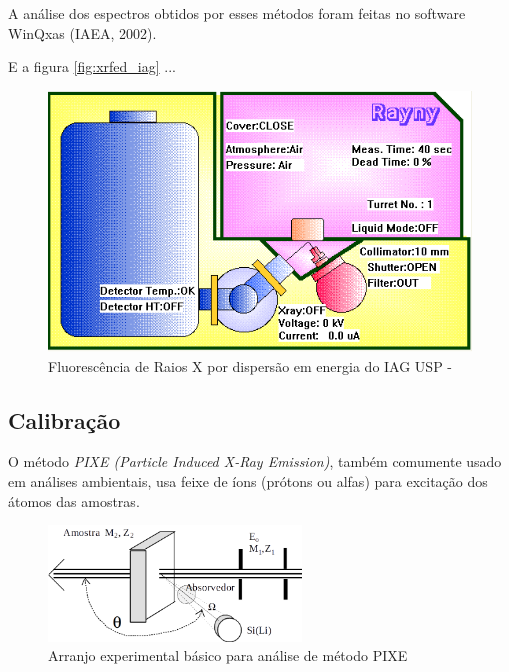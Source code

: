 
A análise dos espectros obtidos por esses métodos foram feitas no software WinQxas (IAEA, 2002).





E a figura \ref{fig:xrfed_iag} ...

\begin{figure}[H]
\begin{center}
  \includegraphics[scale=0.4]{../inputs/images/edx_iag_monitor.png}
  \caption{Fluorescência de Raios X por dispersão em energia do IAG USP - \label{fig:xrfed_software}}
\end{center}
\end{figure}

\subsection{Calibração}

O método \textit{PIXE (Particle Induced X-Ray Emission)}, 
também comumente usado em análises ambientais, usa feixe de íons 
(prótons ou alfas) para excitação dos átomos das amostras.

\begin{figure}[H]
\begin{center} 
  \includegraphics[width=0.6\textwidth]{../inputs/images/arranjopixe.png}
  \caption{Arranjo experimental básico para análise de método PIXE 
           \cite{tabacniks2000} \label{fig:arranjopixe}}
\end{center}
\end{figure}

